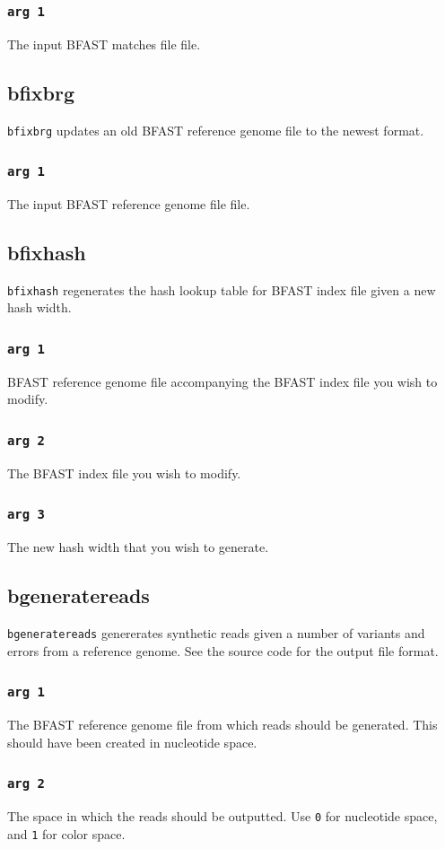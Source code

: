 \documentclass[a4paper,12pt]{book}
\newcommand{\TT}[1]{{\tt #1}} %
\newcommand{\BRGF}{BFAST reference genome file} %
\newcommand{\BIF}{BFAST index file} %
\newcommand{\BMF}{BFAST matches file} %
\begin{document}
\subsubsection{\TT{arg 1}}
The input \BMF{} file.
\subsection{bfixbrg}
\label{sec:bfixbrg}
\TT{bfixbrg} updates an old \BRGF{} to the newest format.
\subsubsection{\TT{arg 1}}
The input \BRGF{} file.
\subsection{bfixhash}
\label{sec:bfixhash}
\TT{bfixhash} regenerates the hash lookup table for \BIF{} given a new hash width.

\subsubsection{\TT{arg 1}}
\BRGF{} accompanying the \BIF{} you wish to modify.

\subsubsection{\TT{arg 2}}
The \BIF{} you wish to modify.

\subsubsection{\TT{arg 3}}
The new hash width that you wish to generate.

\subsection{bgeneratereads}
\label{sec:bgeneratereads}
\TT{bgeneratereads} genererates synthetic reads given a number of variants and errors from a reference genome.
See the source code for the output file format.

\subsubsection{\TT{arg 1}}
The \BRGF{} from which reads should be generated.
This should have been created in nucleotide space.
\subsubsection{\TT{arg 2}}
The space in which the reads should be outputted.
Use \TT{0} for nucleotide space, and \TT{1} for color space.
\end{document}
